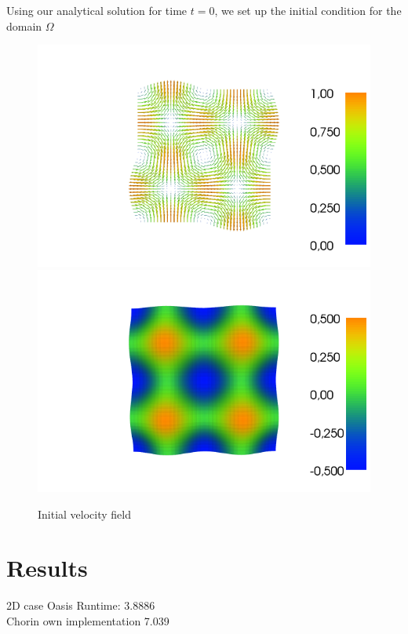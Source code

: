 \documentclass[a4paper,norsk]{article}
\begin{document}
Using our analytical solution for time $t = 0$, we set up the initial condition
for the domain $\Omega$

\begin{figure}[h!]
	\centering
	\caption*{Initial velocity field}
	\includegraphics[scale=0.32]{2D/initial.png}
    \includegraphics[scale=0.32]{2D/initpress.png}
\end{figure}


\section*{Results}
2D case Oasis Runtime: 3.8886 \\

Chorin own implementation 7.039
\end{document}
